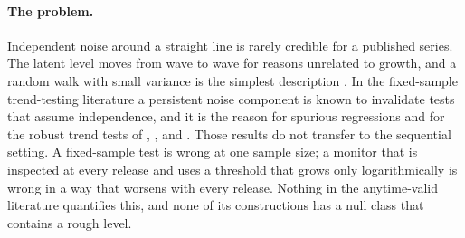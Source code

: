 \documentclass[11pt]{article}
\theoremstyle{plain}
\theoremstyle{definition}
\begin{document}
\paragraph{The problem.} Independent noise around a straight line is rarely credible for a published series. The latent level moves from wave to wave for reasons unrelated to growth, and a random walk with small variance is the simplest description \citep{harvey1989,harvey2000,durbin2012}. In the fixed-sample trend-testing literature a persistent noise component is known to invalidate tests that assume independence, and it is the reason for spurious regressions \citep{granger1974,phillips1986} and for the robust trend tests of \citet{vogelsang1998}, \citet{bunzel2005}, \citet{harvey2007} and \citet{perron2009}. Those results do not transfer to the sequential setting. A fixed-sample test is wrong at one sample size; a monitor that is inspected at every release and uses a threshold that grows only logarithmically is wrong in a way that worsens with every release. Nothing in the anytime-valid literature quantifies this, and none of its constructions has a null class that contains a rough level.
\end{document}

